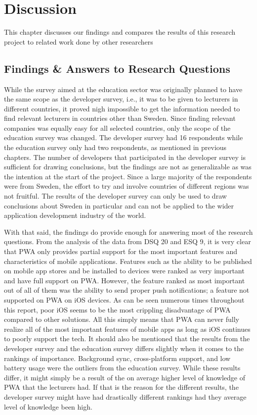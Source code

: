 \documentclass[a4paper,12pt]{article}
\begin{document}
\section{Discussion}
\label{Discussion}
This chapter discusses our findings and compares the results of this research project to related work done by other researchers

\subsection{Findings \& Answers to Research Questions}
\label{Discussion_researchQuestions}
While the survey aimed at the education sector was originally planned to have the same scope as the developer survey, i.e., it was to be given to lecturers in different countries, it proved nigh impossible to get the information needed to find relevant lecturers in countries other than Sweden. Since finding relevant companies was equally easy for all selected countries, only the scope of the education survey was changed. The developer survey had 16 respondents while the education survey only had two respondents, as mentioned in previous chapters. The number of developers that participated in the developer survey is sufficient for drawing conclusions, but the findings are not as generalizable as was the intention at the start of the project. Since a large majority of the respondents were from Sweden, the effort to try and involve countries of different regions was not fruitful. The results of the developer survey can only be used to draw conclusions about Sweden in particular and can not be applied to the wider application development industry of the world.

With that said, the findings do provide enough for answering most of the research questions. From the analysis of the data from DSQ 20 and ESQ 9, it is very clear that PWA only provides partial support for the most important features and characteristics of mobile applications. Features such as the ability to be published on mobile app stores and be installed to devices were ranked as very important and have full support on PWA. However, the feature ranked as most important out of all of them was the ability to send proper push notifications; a feature not supported on PWA on iOS devices. As can be seen numerous times throughout this report, poor iOS seems to be the most crippling disadvantage of PWA compared to other solutions. All this simply means that PWA can never fully realize all of the most important features of mobile apps as long as iOS continues to poorly support the tech. It should also be mentioned that the results from the developer survey and the education survey differs slightly when it comes to the rankings of importance. Background sync, cross-platform support, and low battery usage were the outliers from the education survey. While these results differ, it might simply be a result of the on average higher level of knowledge of PWA that the lecturers had. If that is the reason for the different results, the developer survey might have had drastically different rankings had they average level of knowledge been high.
\end{document}

